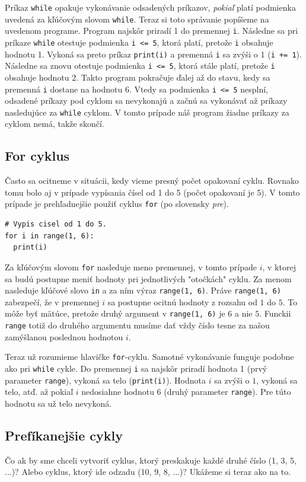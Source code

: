 \documentclass{article}
\begin{document}
Príkaz \texttt{while} opakuje vykonávanie odsadených príkazov, \textit{pokiaľ} platí podmienka uvedená za kľúčovým slovom \texttt{while}. Teraz si toto správanie popíšeme na uvedenom programe. Program najskôr priradí 1 do premennej \texttt{i}. Následne sa pri príkaze \texttt{while} otestuje podmienka \texttt{i <= 5}, ktorá platí, pretože \texttt{i} obsahuje hodnotu 1. Vykoná sa preto príkaz \texttt{print(i)} a premenná \texttt{i} sa zvýši o 1 (\texttt{i += 1}). Následne sa znovu otestuje podmienka \texttt{i <= 5}, ktorá stále platí, pretože \texttt{i} obsahuje hodnotu 2. Takto program pokračuje ďalej až do stavu, kedy sa premenná \texttt{i} dostane na hodnotu 6. Vtedy sa podmienka \texttt{i <= 5} nesplní, odsadené príkazy pod cyklom sa nevykonajú a začnú sa vykonávať až príkazy nasledujúce za \texttt{while} cyklom. V tomto prípade náš program žiadne príkazy za cyklom nemá, takže skončí. 

\subsection{For cyklus}
Často sa ocitneme v situácii, kedy vieme presný počet opakovaní cyklu. Rovnako tomu bolo aj v prípade vypísania čísel od 1 do 5 (počet opakovaní je 5). V tomto prípade je prehľadnejšie použiť cyklus \texttt{for} (po slovensky \textit{pre}).
\begin{lstlisting}
# Vypis cisel od 1 do 5.
for i in range(1, 6):
  print(i)
\end{lstlisting}
Za kľúčovým slovom \texttt{for} nasleduje meno premennej, v tomto prípade $i$, v ktorej sa budú postupne meniť hodnoty pri jednotlivých "otočkách" cyklu. Za menom nasleduje kľúčové slovo \texttt{in} a za ním výraz \texttt{range(1, 6)}. Práve \texttt{range(1, 6)} zabezpečí, že v premennej $i$ sa postupne ocitnú hodnoty z rozsahu od $1$ do $5$. To môže byť mätúce, pretože druhý argument v \texttt{range(1, 6)} je $6$ a nie $5$. Funckii \texttt{range} totiž do druhého argumentu musíme dať vždy číslo tesne za našou zamýšlanou poslednou hodnotou $i$.

Teraz už rozumieme hlavičke \texttt{for}-cyklu. Samotné vykonávanie funguje podobne ako pri \texttt{while} cykle. Do premennej \texttt{i} sa najskôr priradí hodnota 1 (prvý parameter \texttt{range}), vykoná sa telo (\texttt{print(i)}). Hodnota $i$ sa zvýši o $1$, vykoná sa telo, atď. až pokiaľ $i$ nedosiahne hodnotu 6 (druhý parameter \texttt{range}). Pre túto hodnotu sa už telo nevykoná.

\subsection{Prefíkanejšie cykly}
Čo ak by sme chceli vytvoriť cyklus, ktorý preskakuje každé druhé číslo (1, 3, 5, ...)? Alebo cyklus, ktorý ide odzadu (10, 9, 8, ...)? Ukážeme si teraz ako na to.
\end{document}
